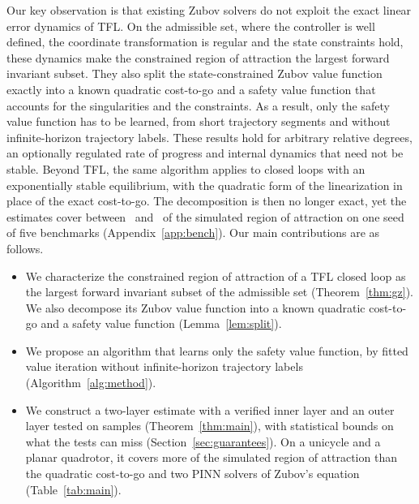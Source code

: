 \documentclass{l4dc2027}
\begin{document}
 Our key observation is that existing Zubov solvers do not exploit the exact linear error dynamics of TFL. On the admissible set, where the controller is well defined, the coordinate transformation is regular and the state constraints hold, these dynamics make the constrained region of attraction the largest forward invariant subset. They also split the state-constrained Zubov value function exactly into a known quadratic cost-to-go and a safety value function that accounts for the singularities and the constraints. As a result, only the safety value function has to be learned, from short trajectory segments and without infinite-horizon trajectory labels. These results hold for arbitrary relative degrees, an optionally regulated rate of progress and internal dynamics that need not be stable. Beyond TFL, the same algorithm applies to closed loops with an exponentially stable equilibrium, with the quadratic form of the linearization in place of the exact cost-to-go. The decomposition is then no longer exact, yet the estimates cover between \resStepBenchCovMin\ and \resStepBenchCovMax\ of the simulated region of attraction on one seed of five benchmarks (Appendix~\ref{app:bench}). Our main contributions are as follows.

\vspace{-0.1in}

\begin{itemize}\setlength{\itemsep}{0pt}\setlength{\parskip}{6pt}\setlength{\topsep}{3pt}
\item We characterize the constrained region of attraction of a TFL closed loop as the largest forward invariant subset of the admissible set (Theorem~\ref{thm:gz}). We also decompose its Zubov value function into a known quadratic cost-to-go and a safety value function (Lemma~\ref{lem:split}).
\item We propose an algorithm that learns only the safety value function, by fitted value iteration without infinite-horizon trajectory labels (Algorithm~\ref{alg:method}).
\item We construct a two-layer estimate with a verified inner layer and an outer layer tested on samples (Theorem~\ref{thm:main}), with statistical bounds on what the tests can miss (Section~\ref{sec:guarantees}). On a unicycle and a planar quadrotor, it covers more of the simulated region of attraction than the quadratic cost-to-go and two PINN solvers of Zubov's equation (Table~\ref{tab:main}).
\end{itemize}
\end{document}
